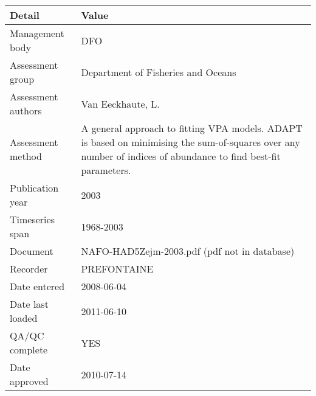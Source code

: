 \begin{table}[htb]
\centering
\begin{tabular}{lp{7cm}}
\toprule
Detail & Value \\
\midrule
Management body    & DFO                                                                                                                                                            \\
Assessment group   & Department of Fisheries and Oceans                                                                                                                             \\
Assessment authors & Van Eeckhaute, L.                                                                                                                                              \\
Assessment method  & A general approach to fitting VPA models. ADAPT is based on minimising the sum-of-squares over any number of indices of abundance to find best-fit parameters. \\
Publication year   & 2003                                                                                                                                                           \\
Timeseries span    & 1968-2003                                                                                                                                                      \\
Document           & NAFO-HAD5Zejm-2003.pdf (pdf not in database)                                                                                                                   \\
Recorder           & PREFONTAINE                                                                                                                                                    \\
Date entered       & 2008-06-04                                                                                                                                                     \\
Date last loaded   & 2011-06-10                                                                                                                                                     \\
QA/QC complete     & YES                                                                                                                                                            \\
Date approved      & 2010-07-14                                                                                                                                                     \\
\bottomrule
\end{tabular}
\label{tab:assessdet}
\end{table}
